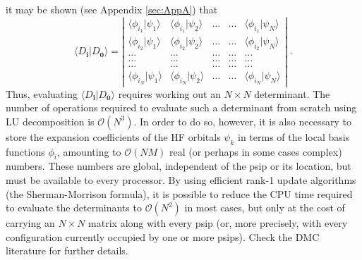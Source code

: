 \documentclass{article}
\newcommand{\bi}{\boldsymbol{i}}
\newcommand{\bzero}{\boldsymbol{0}}
\begin{document}
it may be shown (see Appendix \ref{sec:AppA}) that
\begin{displaymath}
\langle D_{\bi} | D_{\bzero} \rangle = 
\left | 
 \begin{array}{ccccc}
\langle \phi_{i_1} | \psi_1 \rangle & 
\langle \phi_{i_1} | \psi_2 \rangle & 
\ldots & \ldots & 
\langle \phi_{i_1} | \psi_N \rangle \\
\langle \phi_{i_2} | \psi_1 \rangle & 
\langle \phi_{i_2} | \psi_2 \rangle 
& \ldots & \ldots & 
\langle \phi_{i_2} | \psi_N \rangle \\
\ldots & \ldots & \ldots & \ldots & \ldots \\
\ldots & \ldots & \ldots & \ldots & \ldots \\
\ldots & \ldots & \ldots & \ldots & \ldots \\
\langle \phi_{i_N} | \psi_1 \rangle & 
\langle \phi_{i_N} | \psi_2 \rangle & 
\ldots & \ldots & 
\langle \phi_{i_N} | \psi_N \rangle
\end{array} \right |\;.
\end{displaymath}
Thus, evaluating $\langle D_{\bi} | D_{\bzero} \rangle$ requires
working out an $N\times N$ determinant. The number of operations
required to evaluate such a determinant from scratch using LU
decomposition is ${\mathcal O}(N^3)$. In order to do so, however, it
is also necessary to store the expansion coefficients of the HF
orbitals $\psi_k$ in terms of the local basis functions $\phi_i$,
amounting to ${\mathcal O}(NM)$ real (or perhaps in some cases
complex) numbers. These numbers are global, independent of the psip or
its location, but must be available to every processor. By using
efficient rank-1 update algorithms (the Sherman-Morrison formula), it
is possible to reduce the CPU time required to evaluate the
determinants to ${\mathcal O}(N^2)$ in most cases, but only at the
cost of carrying an $N\times N$ matrix along with every psip (or, more
precisely, with every configuration currently occupied by one or more
psips). Check the DMC literature for further details.
\end{document}
